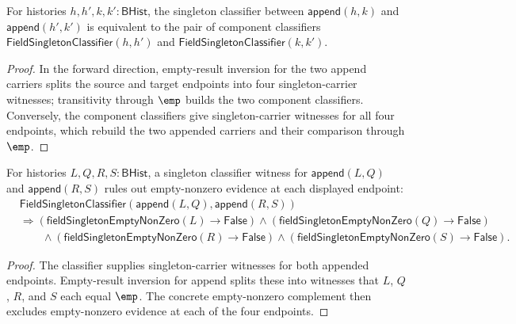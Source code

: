 \begin{theorem}
\label{thm:field-singleton-classifier-append-pair}
For histories $h,h',k,k':\mathsf{BHist}$, the singleton classifier between
$\mathsf{append}(h,k)$ and $\mathsf{append}(h',k')$ is equivalent to the pair
of component classifiers
$\mathsf{FieldSingletonClassifier}(h,h')$ and
$\mathsf{FieldSingletonClassifier}(k,k')$.
\end{theorem}
\begin{proof}
In the forward direction, empty-result inversion for the two append carriers
splits the source and target endpoints into four singleton-carrier witnesses;
transitivity through $\emp$ builds the two component classifiers. Conversely,
the component classifiers give singleton-carrier witnesses for all four
endpoints, which rebuild the two appended carriers and their comparison through
$\emp$.
\end{proof}

\begin{theorem}
\label{thm:field-singleton-classifier-append-endpoint-empty-nonzero-absurd}
For histories $L,Q,R,S:\mathsf{BHist}$, a singleton classifier witness for
$\mathsf{append}(L,Q)$ and $\mathsf{append}(R,S)$ rules out empty-nonzero
evidence at each displayed endpoint:
$$
\begin{aligned}
&\mathsf{FieldSingletonClassifier}(\mathsf{append}(L,Q),\mathsf{append}(R,S))\\
&\Longrightarrow
(\mathsf{fieldSingletonEmptyNonZero}(L)\to\mathsf{False})\land
(\mathsf{fieldSingletonEmptyNonZero}(Q)\to\mathsf{False})\\
&\qquad\land
(\mathsf{fieldSingletonEmptyNonZero}(R)\to\mathsf{False})\land
(\mathsf{fieldSingletonEmptyNonZero}(S)\to\mathsf{False}).
\end{aligned}
$$
\end{theorem}
\begin{proof}
The classifier supplies singleton-carrier witnesses for both appended
endpoints. Empty-result inversion for append splits these into witnesses that
$L$, $Q$, $R$, and $S$ each equal $\emp$. The concrete empty-nonzero complement
then excludes empty-nonzero evidence at each of the four endpoints.
\end{proof}

